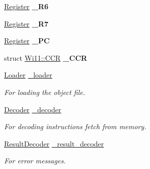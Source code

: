 \begin{DoxyCompactItemize}
\item 
\hypertarget{classWi11_af45f08232aa903851a295b5259f18905}{
\hyperlink{classRegister}{Register} {\bfseries \_\-R6}}
\label{classWi11_af45f08232aa903851a295b5259f18905}

\item 
\hypertarget{classWi11_a0515ac512e8f8e3a122695f823d3abd7}{
\hyperlink{classRegister}{Register} {\bfseries \_\-R7}}
\label{classWi11_a0515ac512e8f8e3a122695f823d3abd7}

\item 
\hypertarget{classWi11_af60b1a832f564e3ac52b4edf7edc8c9a}{
\hyperlink{classRegister}{Register} {\bfseries \_\-PC}}
\label{classWi11_af60b1a832f564e3ac52b4edf7edc8c9a}

\item 
\hypertarget{classWi11_a84cb35829890fca6122c023229007002}{
struct \hyperlink{structWi11_1_1CCR}{Wi11::CCR} {\bfseries \_\-CCR}}
\label{classWi11_a84cb35829890fca6122c023229007002}

\item 
\hypertarget{classWi11_adedbd5442a90d131f8cfadc8d3eb233f}{
\hyperlink{classLoader}{Loader} \hyperlink{classWi11_adedbd5442a90d131f8cfadc8d3eb233f}{\_\-loader}}
\label{classWi11_adedbd5442a90d131f8cfadc8d3eb233f}

\begin{DoxyCompactList}\small\item\em For loading the object file. \item\end{DoxyCompactList}\item 
\hypertarget{classWi11_a145d0e52ef8bfd21d7b5a0ff3fea43d1}{
\hyperlink{classDecoder}{Decoder} \hyperlink{classWi11_a145d0e52ef8bfd21d7b5a0ff3fea43d1}{\_\-decoder}}
\label{classWi11_a145d0e52ef8bfd21d7b5a0ff3fea43d1}

\begin{DoxyCompactList}\small\item\em For decoding instructions fetch from memory. \item\end{DoxyCompactList}\item 
\hypertarget{classWi11_a18515d6caafb4aba3d8a9220b4ac227e}{
\hyperlink{classResultDecoder}{ResultDecoder} \hyperlink{classWi11_a18515d6caafb4aba3d8a9220b4ac227e}{\_\-result\_\-decoder}}
\label{classWi11_a18515d6caafb4aba3d8a9220b4ac227e}

\begin{DoxyCompactList}\small\item\em For error messages. \item\end{DoxyCompactList}\end{DoxyCompactItemize}


